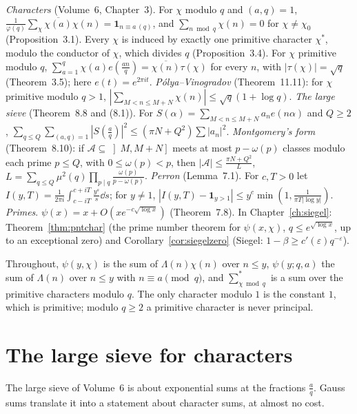 \begin{reminder}
\emph{Characters} (Volume~6, Chapter~3). For $\chi$ modulo $q$ and $(a,q)=1$, $\frac1{\varphi(q)}\sum_\chi\overline{\chi(a)}\chi(n)=\mathbf 1_{n\equiv a\,(q)}$, and $\sum_{n\bmod q}\chi(n)=0$ for $\chi\ne\chi_0$ (Proposition~3.1). Every $\chi$ is induced by exactly one primitive character $\chi^*$, modulo the conductor of $\chi$, which divides $q$ (Proposition~3.4). For $\chi$ primitive modulo $q$, $\sum_{a=1}^q\chi(a)e(\frac{an}q)=\overline{\chi(n)}\tau(\chi)$ for every $n$, with $|\tau(\chi)|=\sqrt q$ (Theorem~3.5); here $e(t)=e^{2\pi it}$. \emph{Pólya--Vinogradov} (Theorem~11.11): for $\chi$ primitive modulo $q>1$, $|\sum_{M<n\le M+N}\chi(n)|\le\sqrt q(1+\log q)$.
\emph{The large sieve} (Theorem~8.8 and (8.1)). For $S(\alpha)=\sum_{M<n\le M+N}a_ne(n\alpha)$ and $Q\ge2$,
$\sum_{q\le Q}\sum_{(a,q)=1}|S(\frac aq)|^2\le(\pi N+Q^2)\sum|a_n|^2$. \emph{Montgomery's form} (Theorem~8.10): if $\mathcal A\subseteq\left]M,M+N\right]$ meets at most $p-\omega(p)$ classes modulo each prime $p\le Q$, with $0\le\omega(p)<p$, then $|\mathcal A|\le\frac{\pi N+Q^2}L$, $L=\sum_{q\le Q}\mu^2(q)\prod_{p\mid q}\frac{\omega(p)}{p-\omega(p)}$.
\emph{Perron} (Lemma~7.1). For $c,T>0$ let $I(y,T)=\frac1{2\pi i}\int_{c-iT}^{c+iT}\frac{y^s}s\dd s$; for $y\ne1$, $|I(y,T)-\mathbf 1_{y>1}|\le y^c\min(1,\frac1{\pi T|\log y|})$.
\emph{Primes}. $\psi(x)=x+O(xe^{-c\sqrt{\log x}})$ (Theorem~7.8). In Chapter~\ref{ch:siegel}: Theorem~\ref{thm:pntchar} (the prime number theorem for $\psi(x,\chi)$, $q\le e^{\sqrt{\log x}}$, up to an exceptional zero) and Corollary~\ref{cor:siegelzero} (Siegel: $1-\beta\ge c'(\varepsilon)q^{-\varepsilon}$).
\end{reminder}

Throughout, $\psi(y,\chi)$ is the sum of $\Lambda(n)\chi(n)$ over $n\le y$, $\psi(y;q,a)$ the sum of $\Lambda(n)$ over $n\le y$ with $n\equiv a\pmod q$, and $\sum^*_{\chi\bmod q}$ is a sum over the primitive characters modulo $q$. The only character modulo $1$ is the constant $1$, which is primitive; modulo $q\ge2$ a primitive character is never principal.

\section{The large sieve for characters}

The large sieve of Volume~6 is about exponential sums at the fractions $\frac aq$. Gauss sums translate it into a statement about character sums, at almost no cost.

